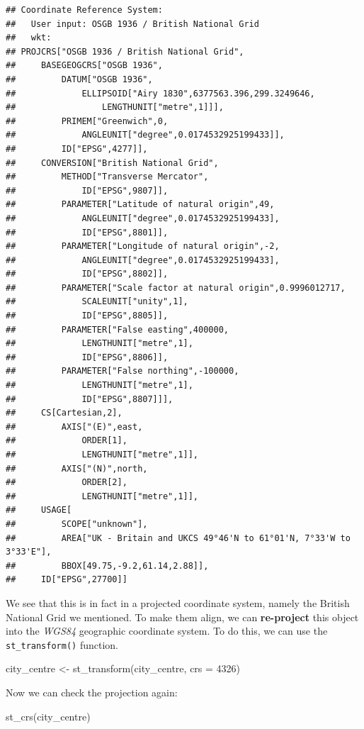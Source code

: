 \documentclass[
]{book}
\makeatletter
\newenvironment{Shaded}{\begin{snugshade}}{\end{snugshade}}
\newcommand{\AttributeTok}[1]{\textcolor[rgb]{0.61,0.61,0.61}{#1}}
\newcommand{\DecValTok}[1]{\textcolor[rgb]{0.06,0.06,0.06}{#1}}
\newcommand{\FunctionTok}[1]{\textcolor[rgb]{0,0,0}{#1}}
\newcommand{\NormalTok}[1]{#1}
\newcommand{\OtherTok}[1]{\textcolor[rgb]{0.37,0.37,0.37}{#1}}
\newenvironment{kframe}{%
\medskip{}
\setlength{\fboxsep}{.8em}
 \def\at@end@of@kframe{}%
 \ifinner\ifhmode%
  \def\at@end@of@kframe{\end{minipage}}%
  \begin{minipage}{\columnwidth}%
 \fi\fi%
 \def\FrameCommand##1{\hskip\@totalleftmargin \hskip-\fboxsep
 \colorbox{shadecolor}{##1}\hskip-\fboxsep
     \hskip-\linewidth \hskip-\@totalleftmargin \hskip\columnwidth}%
 \MakeFramed {\advance\hsize-\width
   \@totalleftmargin\z@ \linewidth\hsize
   \@setminipage}}%
 {\par\unskip\endMakeFramed%
 \at@end@of@kframe}
\renewenvironment{Shaded}{\begin{kframe}}{\end{kframe}}
\makeatother
\begin{document}
\begin{verbatim}
## Coordinate Reference System:
##   User input: OSGB 1936 / British National Grid 
##   wkt:
## PROJCRS["OSGB 1936 / British National Grid",
##     BASEGEOGCRS["OSGB 1936",
##         DATUM["OSGB 1936",
##             ELLIPSOID["Airy 1830",6377563.396,299.3249646,
##                 LENGTHUNIT["metre",1]]],
##         PRIMEM["Greenwich",0,
##             ANGLEUNIT["degree",0.0174532925199433]],
##         ID["EPSG",4277]],
##     CONVERSION["British National Grid",
##         METHOD["Transverse Mercator",
##             ID["EPSG",9807]],
##         PARAMETER["Latitude of natural origin",49,
##             ANGLEUNIT["degree",0.0174532925199433],
##             ID["EPSG",8801]],
##         PARAMETER["Longitude of natural origin",-2,
##             ANGLEUNIT["degree",0.0174532925199433],
##             ID["EPSG",8802]],
##         PARAMETER["Scale factor at natural origin",0.9996012717,
##             SCALEUNIT["unity",1],
##             ID["EPSG",8805]],
##         PARAMETER["False easting",400000,
##             LENGTHUNIT["metre",1],
##             ID["EPSG",8806]],
##         PARAMETER["False northing",-100000,
##             LENGTHUNIT["metre",1],
##             ID["EPSG",8807]]],
##     CS[Cartesian,2],
##         AXIS["(E)",east,
##             ORDER[1],
##             LENGTHUNIT["metre",1]],
##         AXIS["(N)",north,
##             ORDER[2],
##             LENGTHUNIT["metre",1]],
##     USAGE[
##         SCOPE["unknown"],
##         AREA["UK - Britain and UKCS 49°46'N to 61°01'N, 7°33'W to 3°33'E"],
##         BBOX[49.75,-9.2,61.14,2.88]],
##     ID["EPSG",27700]]
\end{verbatim}

We see that this is in fact in a projected coordinate system, namely the British National Grid we mentioned. To make them align, we can \textbf{re-project} this object into the \emph{WGS84} geographic coordinate system. To do this, we can use the \texttt{st\_transform()} function.

\begin{Shaded}
\begin{Highlighting}[]
\NormalTok{city\_centre }\OtherTok{\textless{}{-}} \FunctionTok{st\_transform}\NormalTok{(city\_centre, }\AttributeTok{crs =} \DecValTok{4326}\NormalTok{)}
\end{Highlighting}
\end{Shaded}

Now we can check the projection again:

\begin{Shaded}
\begin{Highlighting}[]
\FunctionTok{st\_crs}\NormalTok{(city\_centre)}
\end{Highlighting}
\end{Shaded}
\end{document}
